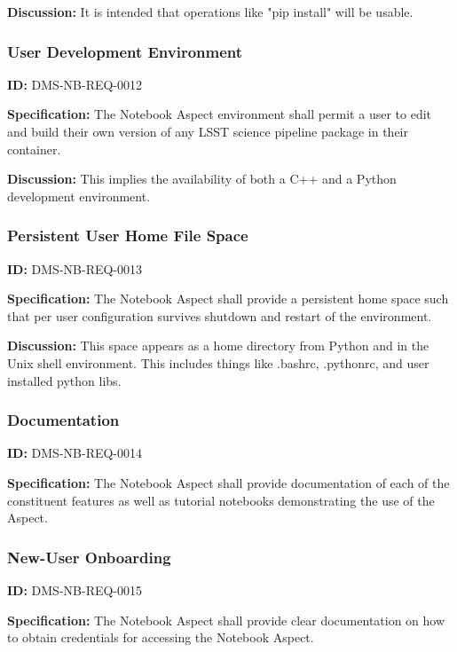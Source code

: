 \documentclass[SE,toc]{lsstdoc}
\begin{document}
\textbf{Discussion:}
It is intended that operations like "pip install" will be usable.

\subsubsection{User Development Environment}

\label{DMS-NB-REQ-0012}
\textbf{ID:} DMS-NB-REQ-0012

\textbf{Specification:}
The Notebook Aspect environment shall permit a user to edit and build their own version of any LSST science pipeline package in their container.

\textbf{Discussion:}
This implies the availability of both a C++ and a Python development environment.

\subsubsection{Persistent User Home File Space}

\label{DMS-NB-REQ-0013}
\textbf{ID:} DMS-NB-REQ-0013

\textbf{Specification:}
The Notebook Aspect shall provide a persistent home space such that per user configuration survives shutdown and restart of the environment.

\textbf{Discussion:}
This space appears as a home directory from Python and in the Unix shell environment. This includes things like .bashrc, .pythonrc, and user installed python libs.

\subsubsection{Documentation}

\label{DMS-NB-REQ-0014}
\textbf{ID:} DMS-NB-REQ-0014

\textbf{Specification:}
The Notebook Aspect shall provide documentation of each of the constituent features as well as tutorial notebooks demonstrating the use of the Aspect.

\subsubsection{New-User Onboarding}

\label{DMS-NB-REQ-0015}
\textbf{ID:} DMS-NB-REQ-0015

\textbf{Specification:}
The Notebook Aspect shall provide clear documentation on how to obtain credentials for accessing the Notebook Aspect.
\end{document}
